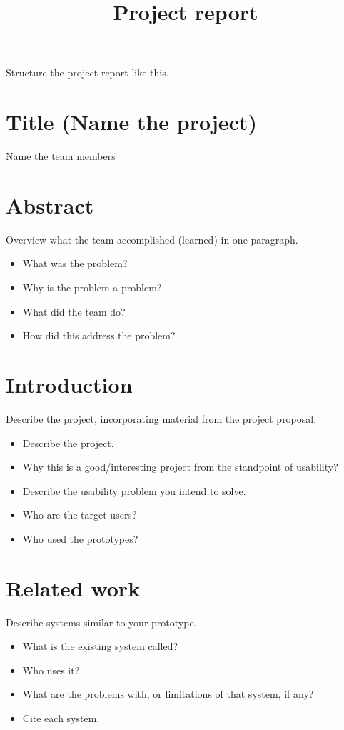 \documentclass[11pt]{article} %
\title{Project report}
\date{} %
\begin{document}
\maketitle

Structure the project report like this.

\section{Title (Name the project)}
Name the team members

\section{Abstract}
Overview what the team accomplished (learned) in one paragraph.

\begin{itemize}
\item What was the problem?
\item Why is the problem a problem?
\item What did the team do?
\item How did this address the problem?
\end{itemize}

\section{Introduction}
Describe the project, incorporating material from the project proposal.

\begin{itemize}
\item Describe the project.
\item Why this is a good/interesting project from the standpoint of usability?
\item Describe the usability problem you intend to solve.
\item Who are the target users?
\item Who used the prototypes?
\end{itemize}

\section{Related work}
Describe systems similar to your prototype.
\begin{itemize}
\item What is the existing system called?
\item Who uses it?
\item What are the problems with, or limitations of that system, if any?
\item Cite each system.
\end{itemize}
\end{document}
